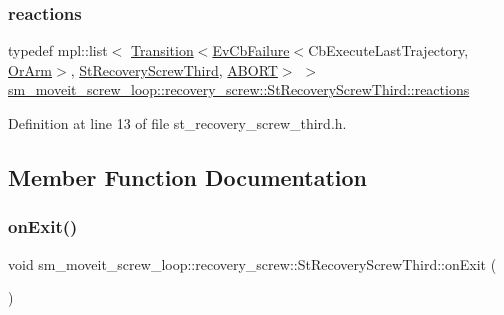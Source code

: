 \subsubsection{\texorpdfstring{reactions}{reactions}}
{\footnotesize\ttfamily typedef mpl\+::list$<$ \hyperlink{classsmacc_1_1Transition}{Transition}$<$\hyperlink{structsmacc_1_1EvCbFailure}{Ev\+Cb\+Failure}$<$Cb\+Execute\+Last\+Trajectory, \hyperlink{classsm__moveit__screw__loop_1_1OrArm}{Or\+Arm}$>$, \hyperlink{structsm__moveit__screw__loop_1_1recovery__screw_1_1StRecoveryScrewThird}{St\+Recovery\+Screw\+Third}, \hyperlink{structsmacc_1_1default__transition__tags_1_1ABORT}{A\+B\+O\+RT}$>$ $>$ \hyperlink{structsm__moveit__screw__loop_1_1recovery__screw_1_1StRecoveryScrewThird_a111d5d6a4eb3308a76a0dbc0eb9d0629}{sm\+\_\+moveit\+\_\+screw\+\_\+loop\+::recovery\+\_\+screw\+::\+St\+Recovery\+Screw\+Third\+::reactions}}



Definition at line 13 of file st\+\_\+recovery\+\_\+screw\+\_\+third.\+h.



\subsection{Member Function Documentation}
\mbox{\label{structsm__moveit__screw__loop_1_1recovery__screw_1_1StRecoveryScrewThird_affc8e39866516a6d88c648522765751a}} 
\subsubsection{\texorpdfstring{on\+Exit()}{onExit()}}
{\footnotesize\ttfamily void sm\+\_\+moveit\+\_\+screw\+\_\+loop\+::recovery\+\_\+screw\+::\+St\+Recovery\+Screw\+Third\+::on\+Exit (\begin{DoxyParamCaption}{ }\end{DoxyParamCaption})\hspace{0.3cm}{\ttfamily [inline]}}



